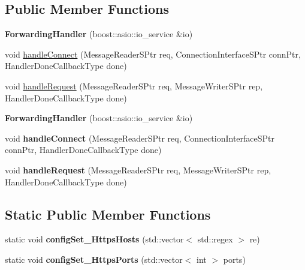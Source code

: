 \subsection*{Public Member Functions}
\begin{DoxyCompactItemize}
\item 
\mbox{\label{class_forwarding_handler_a86bb59fe85fa0bc42b26715b59e34583}} 
{\bfseries Forwarding\+Handler} (boost\+::asio\+::io\+\_\+service \&io)
\item 
void \hyperlink{class_forwarding_handler_ac4f8ecec2ca1267b8fdf806c5d4cc155}{handle\+Connect} (Message\+Reader\+S\+Ptr req, Connection\+Interface\+S\+Ptr conn\+Ptr, Handler\+Done\+Callback\+Type done)
\item 
void \hyperlink{class_forwarding_handler_ab5007f621c7f0fe5a9c92b71ff6c15ef}{handle\+Request} (Message\+Reader\+S\+Ptr req, Message\+Writer\+S\+Ptr rep, Handler\+Done\+Callback\+Type done)
\item 
\mbox{\label{class_forwarding_handler_a86bb59fe85fa0bc42b26715b59e34583}} 
{\bfseries Forwarding\+Handler} (boost\+::asio\+::io\+\_\+service \&io)
\item 
\mbox{\label{class_forwarding_handler_ac4f8ecec2ca1267b8fdf806c5d4cc155}} 
void {\bfseries handle\+Connect} (Message\+Reader\+S\+Ptr req, Connection\+Interface\+S\+Ptr conn\+Ptr, Handler\+Done\+Callback\+Type done)
\item 
\mbox{\label{class_forwarding_handler_ab5007f621c7f0fe5a9c92b71ff6c15ef}} 
void {\bfseries handle\+Request} (Message\+Reader\+S\+Ptr req, Message\+Writer\+S\+Ptr rep, Handler\+Done\+Callback\+Type done)
\end{DoxyCompactItemize}
\subsection*{Static Public Member Functions}
\begin{DoxyCompactItemize}
\item 
\mbox{\label{class_forwarding_handler_adddd57d657fa1ffee84de10bf265a6b7}} 
static void {\bfseries config\+Set\+\_\+\+Https\+Hosts} (std\+::vector$<$ std\+::regex $>$ re)
\item 
\mbox{\label{class_forwarding_handler_a6a10a3c09de0e6b78471fa6af669e2e5}} 
static void {\bfseries config\+Set\+\_\+\+Https\+Ports} (std\+::vector$<$ int $>$ ports)
\end{DoxyCompactItemize}
